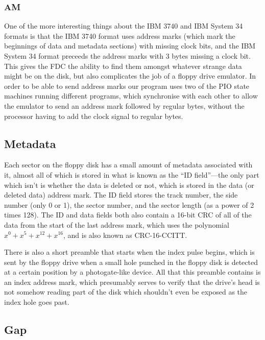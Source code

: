 \documentclass[a4paper]{article}
\begin{document}
\subsubsection{AM}
\label{subsubsec:am}

One of the more interesting things about the IBM 3740 and IBM System
34 formats is that the IBM 3740 format uses address marks (which mark
the beginnings of data and metadata sections) with missing clock bits,
and the IBM System 34 format preceeds the address marks with 3 bytes
missing a clock bit. This gives the FDC the ability to find them
amongst whatever strange data might be on the disk, but also
complicates the job of a floppy drive emulator. In order to be able to
send address marks our program uses two of the PIO state machines
running different programs, which synchronise with each other to allow
the emulator to send an address mark followed by regular bytes,
without the processor having to add the clock signal to regular bytes.

\subsection{Metadata}

Each sector on the floppy disk has a small amount of metadata
associated with it, almost all of which is stored in what is known as
the ``ID field''---the only part which isn't is whether the data is
deleted or not, which is stored in the data (or deleted data) address
mark. The ID field stores the track number, the side number (only 0 or
1), the sector number, and the sector length (as a power of 2 times
128). The ID and data fields both also contain a 16-bit CRC of all of
the data from the start of the last address mark, which uses the
polynomial \(x^0 + x^5 + x^{12} + x^{16}\), and is also known as
CRC-16-CCITT.

There is also a short preamble that starts when the index pulse
begins, which is sent by the floppy drive when a small hole punched in
the floppy disk is detected at a certain position by a photogate-like
device. All that this preamble contains is an index address mark,
which presumably serves to verify that the drive's head is not somehow
reading part of the disk which shouldn't even be exposed as the index
hole goes past.

\subsection{Gap}
\end{document}
